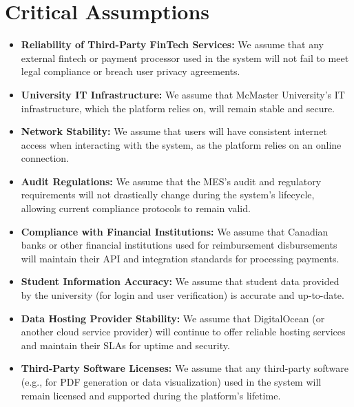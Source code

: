 \documentclass{article}
\begin{document}
\section{Critical Assumptions}

\begin{itemize}
    \item \textbf{Reliability of Third-Party FinTech Services:} We assume that any external fintech or payment processor used in the system will not fail to meet legal compliance or breach user privacy agreements.
    
    \item \textbf{University IT Infrastructure:} We assume that McMaster University’s IT infrastructure, which the platform relies on, will remain stable and secure.
    
    \item \textbf{Network Stability:} We assume that users will have consistent internet access when interacting with the system, as the platform relies on an online connection.
    
    \item \textbf{Audit Regulations:} We assume that the MES's audit and regulatory requirements will not drastically change during the system's lifecycle, allowing current compliance protocols to remain valid.
    
    \item \textbf{Compliance with Financial Institutions:} We assume that Canadian banks or other financial institutions used for reimbursement disbursements will maintain their API and integration standards for processing payments.
    
    \item \textbf{Student Information Accuracy:} We assume that student data provided by the university (for login and user verification) is accurate and up-to-date.
    
    \item \textbf{Data Hosting Provider Stability:} We assume that DigitalOcean (or another cloud service provider) will continue to offer reliable hosting services and maintain their SLAs for uptime and security.
    
    \item \textbf{Third-Party Software Licenses:} We assume that any third-party software (e.g., for PDF generation or data visualization) used in the system will remain licensed and supported during the platform's lifetime.
\end{itemize}
\end{document}

